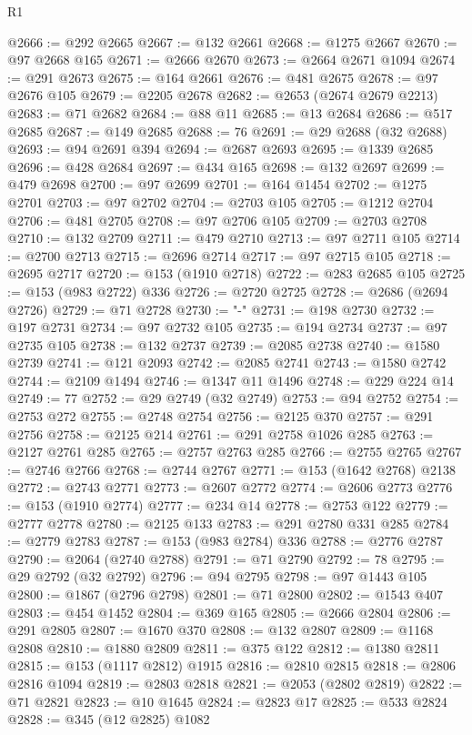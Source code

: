 \begin{lexlean}{R1}
\begin{coremodule}
{{{{{{{{{{{{{{{{{{{{{{{{{{{{{{{{{{{{{{{{{{{{{{{{{{{{{{{{{{{{{{{{{{{{{{{{{{{{{{{{{{{{{{{{{{{{{{{{{{{{{{{{{{{{{{{{{{{{{{{{{{{{{{{{{{{{{{{{{{{{{{{{{{{{{{{{{{{{{{{{{{{{{{{{{{{{{{{{{{{{{{{{{{@2666 := @292 @2665
@2667 := @132 @2661
@2668 := @1275 @2667
@2670 := @97 @2668 @165
@2671 := @2666 @2670
@2673 := @2664 @2671 @1094
@2674 := @291 @2673
@2675 := @164 @2661
@2676 := @481 @2675
@2678 := @97 @2676 @105
@2679 := @2205 @2678
@2682 := @2653 (@2674 @2679 @2213)
@2683 := @71 @2682
@2684 := @88 @11
@2685 := @13 @2684
@2686 := @517 @2685
@2687 := @149 @2685
@2688 := 76
@2691 := @29 @2688 (@32 @2688)
@2693 := @94 @2691 @394
@2694 := @2687 @2693
@2695 := @1339 @2685
@2696 := @428 @2684
@2697 := @434 @165
@2698 := @132 @2697
@2699 := @479 @2698
@2700 := @97 @2699
@2701 := @164 @1454
@2702 := @1275 @2701
@2703 := @97 @2702
@2704 := @2703 @105
@2705 := @1212 @2704
@2706 := @481 @2705
@2708 := @97 @2706 @105
@2709 := @2703 @2708
@2710 := @132 @2709
@2711 := @479 @2710
@2713 := @97 @2711 @105
@2714 := @2700 @2713
@2715 := @2696 @2714
@2717 := @97 @2715 @105
@2718 := @2695 @2717
@2720 := @153 (@1910 @2718)
@2722 := @283 @2685 @105
@2725 := @153 (@983 @2722) @336
@2726 := @2720 @2725
@2728 := @2686 (@2694 @2726)
@2729 := @71 @2728
@2730 := "-"
@2731 := @198 @2730
@2732 := @197 @2731
@2734 := @97 @2732 @105
@2735 := @194 @2734
@2737 := @97 @2735 @105
@2738 := @132 @2737
@2739 := @2085 @2738
@2740 := @1580 @2739
@2741 := @121 @2093
@2742 := @2085 @2741
@2743 := @1580 @2742
@2744 := @2109 @1494
@2746 := @1347 @11 @1496
@2748 := @229 @224 @14
@2749 := 77
@2752 := @29 @2749 (@32 @2749)
@2753 := @94 @2752
@2754 := @2753 @272
@2755 := @2748 @2754
@2756 := @2125 @370
@2757 := @291 @2756
@2758 := @2125 @214
@2761 := @291 @2758 @1026 @285
@2763 := @2127 @2761 @285
@2765 := @2757 @2763 @285
@2766 := @2755 @2765
@2767 := @2746 @2766
@2768 := @2744 @2767
@2771 := @153 (@1642 @2768) @2138
@2772 := @2743 @2771
@2773 := @2607 @2772
@2774 := @2606 @2773
@2776 := @153 (@1910 @2774)
@2777 := @234 @14
@2778 := @2753 @122
@2779 := @2777 @2778
@2780 := @2125 @133
@2783 := @291 @2780 @331 @285
@2784 := @2779 @2783
@2787 := @153 (@983 @2784) @336
@2788 := @2776 @2787
@2790 := @2064 (@2740 @2788)
@2791 := @71 @2790
@2792 := 78
@2795 := @29 @2792 (@32 @2792)
@2796 := @94 @2795
@2798 := @97 @1443 @105
@2800 := @1867 (@2796 @2798)
@2801 := @71 @2800
@2802 := @1543 @407
@2803 := @454 @1452
@2804 := @369 @165
@2805 := @2666 @2804
@2806 := @291 @2805
@2807 := @1670 @370
@2808 := @132 @2807
@2809 := @1168 @2808
@2810 := @1880 @2809
@2811 := @375 @122
@2812 := @1380 @2811
@2815 := @153 (@1117 @2812) @1915
@2816 := @2810 @2815
@2818 := @2806 @2816 @1094
@2819 := @2803 @2818
@2821 := @2053 (@2802 @2819)
@2822 := @71 @2821
@2823 := @10 @1645
@2824 := @2823 @17
@2825 := @533 @2824
@2828 := @345 (@12 @2825) @1082
}}}}}}}}}}}}}}}}}}}}}}}}}}}}}}}}}}}}}}}}}}}}}}}}}}}}}}}}}}}}}}}}}}}}}}}}}}}}}}}}}}}}}}}}}}}}}}}}}}}}}}}}}}}}}}}}}}}}}}}}}}}}}}}}}}}}}}}}}}}}}}}}}}}}}}}}}}}}}}}}}}}}}}}}}}}}}}}}}}}}}}}}}}
\end{coremodule}
\end{lexlean}
